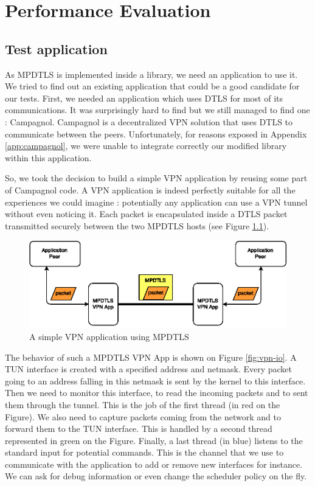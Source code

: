 \chapter{Performance Evaluation}\label{chap:perfs}

\section{Test application}\label{sec:vpnapp}

As MPDTLS is implemented inside a library, we need an application to use it. We tried to find out an existing application that could be a good candidate for our tests. First, we needed an application which uses DTLS for most of its communications. It was surprisingly hard to find but we still managed to find one : Campagnol\cite{campagnol}. Campagnol is a decentralized VPN solution that uses DTLS to communicate between the peers. Unfortunately, for reasons exposed in Appendix \ref{app:campagnol}, we were unable to integrate correctly our modified library within this application.

So, we took the decision to build a simple VPN application \cite{mpdtls-vpn} by reusing some part of Campagnol code. A VPN application is indeed perfectly suitable for all the experiences we could imagine : potentially any application can use a VPN tunnel without even noticing it. Each packet is encapsulated inside a DTLS packet transmitted securely between the two MPDTLS hosts (see Figure \ref{fig:vpn}).

\begin{figure}[!ht]
\centering
\includegraphics{images/vpn.eps}
\caption{A simple VPN application using MPDTLS}
\label{fig:vpn}
\end{figure}

The behavior of such a MPDTLS VPN App is shown on Figure \ref{fig:vpn-io}. A TUN interface is created with a specified address and netmask. Every packet going to an address falling in this netmask is sent by the kernel to this interface. Then we need to monitor this interface, to read the incoming packets and to sent them through the tunnel. This is the job of the first thread (in red on the Figure). We also need to capture packets coming from the network and to forward them to the TUN interface. This is handled by a second thread represented in green on the Figure. Finally, a last thread (in blue) listens to the standard input for potential commands. This is the channel that we use to communicate with the application to add or remove new interfaces for instance. We can ask for debug information or even change the scheduler policy on the fly.


